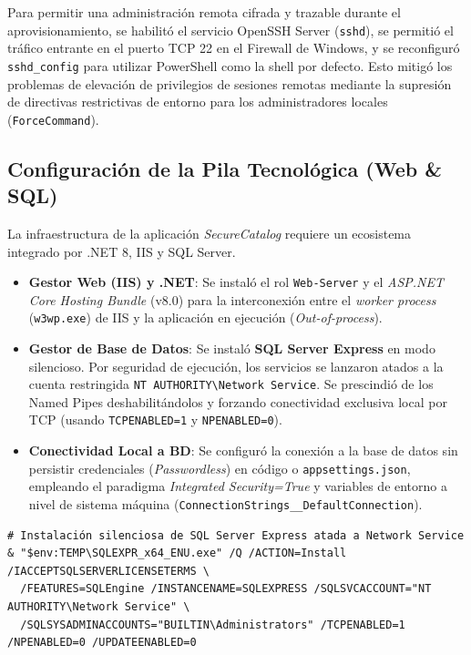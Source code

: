 Para permitir una administración remota cifrada y trazable durante el aprovisionamiento, se habilitó el servicio OpenSSH Server (\texttt{sshd}), se permitió el tráfico entrante en el puerto TCP 22 en el Firewall de Windows, y se reconfiguró \texttt{sshd\_}\allowbreak\texttt{config} para utilizar PowerShell como la shell por defecto. Esto mitigó los problemas de elevación de privilegios de sesiones remotas mediante la supresión de directivas restrictivas de entorno para los administradores locales (\texttt{Force}\allowbreak\texttt{Command}).

\subsection{Configuración de la Pila Tecnológica (Web \& SQL)}
La infraestructura de la aplicación \textit{SecureCatalog} requiere un ecosistema integrado por .NET 8, IIS y SQL Server.
\begin{itemize}
    \item \textbf{Gestor Web (IIS) y .NET}: Se instaló el rol \texttt{Web-Server} y el \textit{ASP.NET Core Hosting Bundle} (v8.0) para la interconexión entre el \textit{worker process} (\texttt{w3wp.}\allowbreak\texttt{exe}) de IIS y la aplicación en ejecución (\textit{Out-of-process}).
    \item \textbf{Gestor de Base de Datos}: Se instaló \textbf{SQL Server Express} en modo silencioso. Por seguridad de ejecución, los servicios se lanzaron atados a la cuenta restringida \texttt{NT AUTHORITY\textbackslash Network Service}. Se prescindió de los Named Pipes deshabilitándolos y forzando conectividad exclusiva local por TCP (usando \texttt{TCPENABLED=1} y \texttt{NPENABLED=0}).
    \item \textbf{Conectividad Local a BD}: Se configuró la conexión a la base de datos sin persistir credenciales (\textit{Passwordless}) en código o \texttt{appsettings.json}, empleando el paradigma \textit{Integrated Security=True} y variables de entorno a nivel de sistema máquina (\texttt{ConnectionStrings\_\_DefaultConnection}).
\end{itemize}

\begin{lstlisting}
# Instalación silenciosa de SQL Server Express atada a Network Service
& "$env:TEMP\SQLEXPR_x64_ENU.exe" /Q /ACTION=Install /IACCEPTSQLSERVERLICENSETERMS \
  /FEATURES=SQLEngine /INSTANCENAME=SQLEXPRESS /SQLSVCACCOUNT="NT AUTHORITY\Network Service" \
  /SQLSYSADMINACCOUNTS="BUILTIN\Administrators" /TCPENABLED=1 /NPENABLED=0 /UPDATEENABLED=0
\end{lstlisting}

